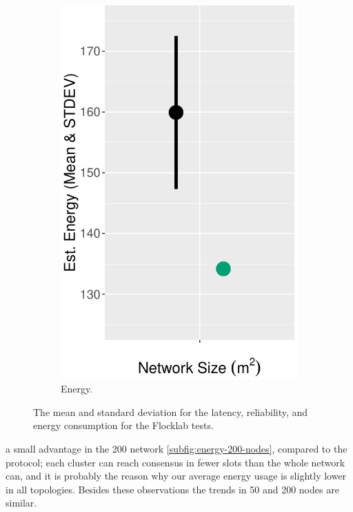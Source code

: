 \begin{figure}[bt]
\begin{subfigure}{0.32\textwidth}
        \includegraphics[width=\textwidth, keepaspectratio]{figure/Results/ChaosComparison/Flocklab/FlocklabComparison_Energy.pdf}
        \caption{Energy.}
        \label{subfig:flocklab-energy}
    \end{subfigure}
    \caption{The mean and standard deviation for the latency, reliability, and energy consumption for the Flocklab tests.}
    \label{fig:flocklab-results}
\end{figure}

a small advantage in the 200 network \cref{subfig:energy-200-nodes}, compared to the \atwo{} protocol; each cluster can reach consensus in fewer slots than the whole network can, and it is probably the reason why our average energy usage is slightly lower in all topologies. Besides these observations the trends in 50 and 200 nodes are similar.



